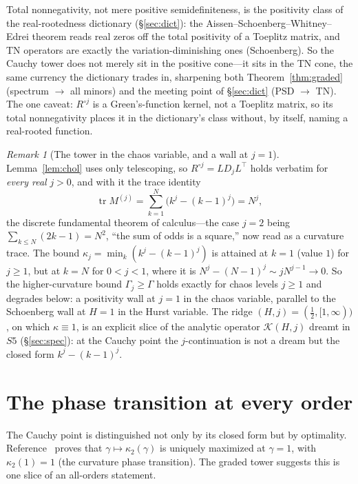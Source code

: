 \documentclass[11pt,reqno]{amsart}
\theoremstyle{plain}
\theoremstyle{definition}
\theoremstyle{remark}
\newtheorem{remark}[theorem]{Remark}
\newcommand{\Had}{\circ}
\DeclareMathOperator{\tr}{tr}
\begin{document}
Total nonnegativity, not mere positive semidefiniteness, is the
positivity class of the real-rootedness dictionary
(\S\ref{sec:dict}): the Aissen--Schoenberg--Whitney--Edrei theorem reads
real zeros off the total positivity of a Toeplitz matrix, and TN
operators are exactly the variation-diminishing ones (Schoenberg). So the
Cauchy tower does not merely sit in the positive cone---it sits in the TN
cone, the same currency the dictionary trades in, sharpening both
Theorem~\ref{thm:graded} (spectrum $\to$ all minors) and the meeting point
of \S\ref{sec:dict} (PSD $\to$ TN). The one caveat: $R^{\Had j}$ is a
Green's-function kernel, not a Toeplitz matrix, so its total nonnegativity
places it in the dictionary's class without, by itself, naming a
real-rooted function.

\begin{remark}[The tower in the chaos variable, and a wall at $j=1$]
\label{rem:chaosvar}
Lemma~\ref{lem:chol} uses only telescoping, so $R^{\Had j}=LD_jL^{\top}$
holds verbatim for \emph{every real} $j>0$, and with it the trace
identity
\[
   \tr M^{(j)}=\sum_{k=1}^N\bigl(k^j-(k-1)^j\bigr)=N^{j},
\]
the discrete fundamental theorem of calculus---the case $j=2$ being
$\sum_{k\le N}(2k-1)=N^2$, ``the sum of odds is a square,'' now read as a
curvature trace. The bound $\kappa_j=\min_k(k^j-(k-1)^j)$ is attained at
$k=1$ (value $1$) for $j\ge1$, but at $k=N$ for $0<j<1$, where it is
$N^j-(N-1)^j\sim jN^{j-1}\to0$. So the higher-curvature bound
$\Gamma_j\ge\Gamma$ holds exactly for chaos levels $j\ge1$ and degrades
below: a positivity wall at $j=1$ in the chaos variable, parallel to the
Schoenberg wall at $H=1$ in the Hurst variable. The ridge
$(H,j)=(\tfrac12,[1,\infty))$, on which $\kappa\equiv1$, is an explicit
slice of the analytic operator $\mathcal K(H,j)$ dreamt in $S5$
(\S\ref{sec:spec}): at the Cauchy point the $j$-continuation is not a
dream but the closed form $k^j-(k-1)^j$.
\end{remark}

\section{The phase transition at every order}\label{sec:phase}

The Cauchy point is distinguished not only by its closed form but by
optimality. Reference~\cite{FontesBE} proves that
$\gamma\mapsto\kappa_2(\gamma)$ is uniquely maximized at $\gamma=1$,
with $\kappa_2(1)=1$ (the curvature phase transition). The graded tower
suggests this is one slice of an all-orders statement.
\end{document}
